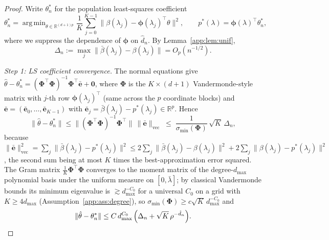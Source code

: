 \documentclass[11pt]{article}
\theoremstyle{plain}
\theoremstyle{definition}
\newcommand{\R}{\mathbb{R}}
\newcommand{\bPhi}{\bm{\Phi}}
\newcommand{\bphi}{\bm{\phi}}
\DeclareMathOperator*{\argmin}{arg\,min}
\begin{document}
\begin{proof}
Write $\theta^*_n$ for the population least-squares coefficient
\[
  \theta^*_n=\argmin_{\theta\in\R^{(d+1)p}}
  \frac1K\sum_{j=0}^{K-1}
  \bigl\|\beta(\lambda_j)-\bphi(\lambda_j)^\top\theta\bigr\|^2,
  \qquad p^*(\lambda)=\bphi(\lambda)^\top\theta^*_n,
\]
where we suppress the dependence of $\bphi$ on $\hat d_n$. By
Lemma~\ref{app:lem:unif},
\begin{equation}\label{app:eq:unifbar}
  \Delta_n:=\max_{j}\|\bar\beta(\lambda_j)-\beta(\lambda_j)\|
  =O_p(n^{-1/2}).
\end{equation}

\emph{Step 1: LS coefficient convergence.} The normal equations give
$\hat\theta-\theta^*_n=(\bPhi^\top\bPhi)^{-1}\bPhi^\top
\bar{\bm e}+\bm 0$, where $\bPhi$ is the $K\times(d+1)$ Vandermonde-style
matrix with $j$-th row $\bphi(\lambda_j)^\top$ (same across the $p$
coordinate blocks) and
$\bar{\bm e}=(\bar{\bm e}_0,\dots,\bar{\bm e}_{K-1})$ with
$\bar{\bm e}_j=\bar\beta(\lambda_j)-p^*(\lambda_j)\in\R^p$. Hence
\[
  \|\hat\theta-\theta^*_n\|
  \le\bigl\|(\bPhi^\top\bPhi)^{-1}\bPhi^\top\bigr\|\,
    \|\bar{\bm e}\|_{\mathrm{vec}}
  \;\le\;\frac{1}{\sigma_{\min}(\bPhi)}\,
    \sqrt{K}\,\Delta_n ,
\]
because $\|\bar{\bm e}\|_{\mathrm{vec}}^2=\sum_j\|\bar\beta(\lambda_j)
-p^*(\lambda_j)\|^2\le 2\sum_j\|\bar\beta(\lambda_j)-\beta(\lambda_j)\|^2
+2\sum_j\|\beta(\lambda_j)-p^*(\lambda_j)\|^2$, the second sum being at
most $K$ times the best-approximation error squared. The Gram matrix
$\frac1K\bPhi^\top\bPhi$ converges to the moment matrix of the
degree-$d_{\max}$ polynomial basis under the uniform measure on
$[0,\bar\lambda]$; by classical Vandermonde bounds its minimum eigenvalue
is $\gtrsim d_{\max}^{-C_0}$ for a universal $C_0$ on a grid with
$K\ge 4d_{\max}$ (Assumption~\ref{app:ass:degree}), so
$\sigma_{\min}(\bPhi)\ge c\sqrt{K}\,d_{\max}^{-C_0}$ and
\begin{equation}\label{app:eq:thetahat}
  \|\hat\theta-\theta^*_n\|
  \le C\,d_{\max}^{C_0}\,\Bigl(\Delta_n
     +\sqrt{K}\,\rho^{-\hat d_n}\Bigr).
\end{equation}


\end{proof}
\end{document}
